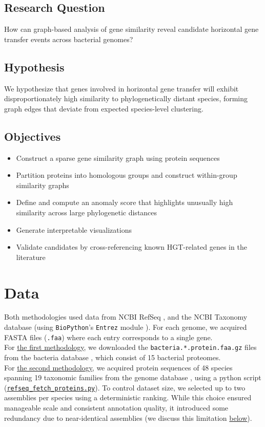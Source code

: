 \documentclass[11pt]{article}
\begin{document}
	\FloatBarrier
	
	\subsection{Research Question}
	How can graph-based analysis of gene similarity reveal candidate horizontal gene transfer events across bacterial genomes?
	
	\subsection{Hypothesis}
	We hypothesize that genes involved in horizontal gene transfer will exhibit disproportionately high similarity to phylogenetically distant species, forming graph edges that deviate from expected species-level clustering.
	
	\subsection{Objectives}
	\begin{itemize}[noitemsep, topsep=0pt]
		\item Construct a sparse gene similarity graph using protein sequences
		\item Partition proteins into homologous groups and construct within-group similarity graphs
		\item Define and compute an anomaly score that highlights unusually high similarity across large phylogenetic distances
		\item Generate interpretable visualizations
		\item Validate candidates by cross-referencing known HGT-related genes in the literature
	\end{itemize}
	
	\section{Data}
	\label{sec:data}
	Both methodologies used data from NCBI RefSeq \cite{RefSeq}, and the NCBI Taxonomy database \cite{NCBITaxonomy} (using \texttt{BioPython}'s \texttt{Entrez} module \cite{BioPythonEntrez}).
	For each genome, we acquired FASTA files (\texttt{.faa}) where each entry corresponds to a single gene.\\
	For \hyperref[subsec:method1]{the first methodology}, we downloaded the \texttt{bacteria.*.protein.faa.gz} files from the bacteria database \cite{RefSeqBacteria}, which consist of 15 bacterial proteomes.\\
	For \hyperref[subsec:method2]{the second methodology}, we acquired protein sequences of 48 species spanning 19 taxonomic families from the genome database \cite{RefSeqGenome}, using a python script (\href{https://github.com/noam-kimhi/Who-Stole-My-Genes/blob/main/Method\%202/src/graph_construction/refseq_fetch_proteins.py}{\uline{\texttt{refseq\_fetch\_proteins.py}}}). To control dataset size, we selected up to two assemblies per species using a deterministic
	ranking. While this choice ensured manageable scale and consistent annotation quality, it introduced some redundancy due to near-identical assemblies (we discuss this limitation \hyperref[subsubsec:evaluation]{below}).
	
\end{document}
